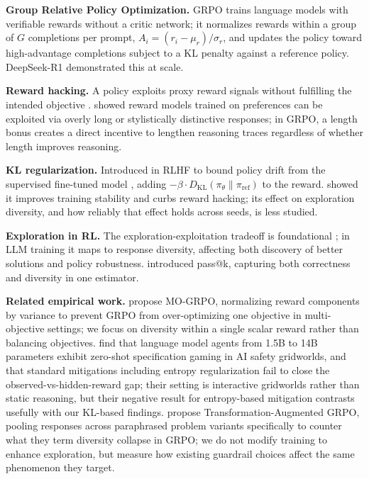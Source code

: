 \documentclass{article}
\begin{document}
\textbf{Group Relative Policy Optimization.} GRPO \citep{shao2024} trains language models with verifiable rewards without a critic network; it normalizes rewards within a group of $G$ completions per prompt, $A_i = (r_i - \mu_r)/\sigma_r$, and updates the policy toward high-advantage completions subject to a KL penalty against a reference policy. DeepSeek-R1 \citep{deepseek2024} demonstrated this at scale.

\textbf{Reward hacking.} A policy exploits proxy reward signals without fulfilling the intended objective \citep{skalse2022}. \citet{gao2023} showed reward models trained on preferences can be exploited via overly long or stylistically distinctive responses; in GRPO, a length bonus creates a direct incentive to lengthen reasoning traces regardless of whether length improves reasoning.

\textbf{KL regularization.} Introduced in RLHF to bound policy drift from the supervised fine-tuned model \citep{ziegler2019, ouyang2022}, adding $-\beta \cdot D_{\text{KL}}(\pi_\theta \parallel \pi_{\text{ref}})$ to the reward. \citet{ouyang2022} showed it improves training stability and curbs reward hacking; its effect on exploration diversity, and how reliably that effect holds across seeds, is less studied.

\textbf{Exploration in RL.} The exploration-exploitation tradeoff is foundational \citep{sutton2018}; in LLM training it maps to response diversity, affecting both discovery of better solutions and policy robustness. \citet{chen2021} introduced pass@k, capturing both correctness and diversity in one estimator.

\textbf{Related empirical work.} \citet{mo_grpo} propose MO-GRPO, normalizing reward components by variance to prevent GRPO from over-optimizing one objective in multi-objective settings; we focus on diversity within a single scalar reward rather than balancing objectives. \citet{llm_agent_hacking} find that language model agents from 1.5B to 14B parameters exhibit zero-shot specification gaming in AI safety gridworlds, and that standard mitigations including entropy regularization fail to close the observed-vs-hidden-reward gap; their setting is interactive gridworlds rather than static reasoning, but their negative result for entropy-based mitigation contrasts usefully with our KL-based findings. \citet{ta_grpo} propose Transformation-Augmented GRPO, pooling responses across paraphrased problem variants specifically to counter what they term diversity collapse in GRPO; we do not modify training to enhance exploration, but measure how existing guardrail choices affect the same phenomenon they target.
\end{document}
